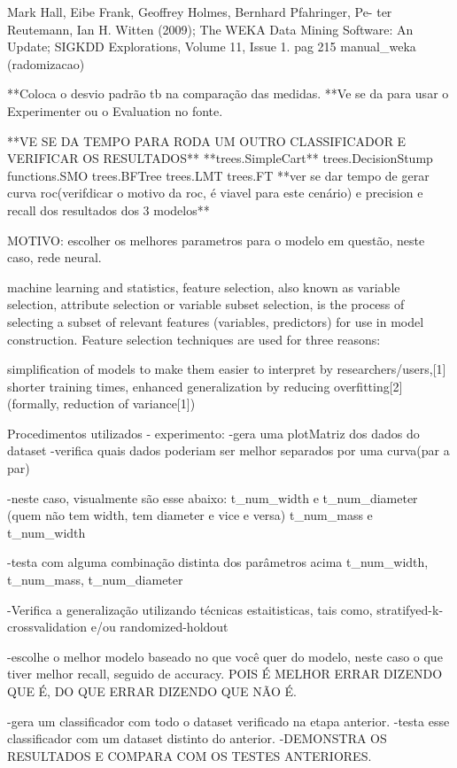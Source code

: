 Mark Hall, Eibe Frank, Geoffrey Holmes, Bernhard Pfahringer, Pe- ter Reutemann, Ian H. Witten (2009); The WEKA Data Mining Software: An Update; SIGKDD Explorations, Volume 11, Issue 1.
pag 215 manual_weka (radomizacao)

**Coloca o desvio padrão tb na comparação das medidas.
**Ve se da para usar o Experimenter ou o Evaluation no fonte.


**VE SE DA TEMPO PARA RODA UM OUTRO CLASSIFICADOR E VERIFICAR OS RESULTADOS**
**trees.SimpleCart**
trees.DecisionStump
functions.SMO
trees.BFTree
trees.LMT
trees.FT
**ver se dar tempo de gerar curva roc(verifdicar o motivo da roc, é viavel para este cenário) e precision e recall dos resultados dos 3 modelos**

MOTIVO:
escolher os melhores parametros para o modelo em questão, neste caso, rede neural.

 machine learning and statistics, feature selection, also known as variable selection, attribute selection or variable subset selection, is the process of selecting a subset of relevant features (variables, predictors) for use in model construction. Feature selection techniques are used for three reasons:

        simplification of models to make them easier to interpret by researchers/users,[1]
        shorter training times,
        enhanced generalization by reducing overfitting[2](formally, reduction of variance[1])



Procedimentos utilizados - experimento:
-gera uma plotMatriz dos dados do dataset
-verifica quais dados poderiam ser melhor separados por uma curva(par a par)

-neste caso, visualmente são esse abaixo:
t_num_width e t_num_diameter
(quem não tem width, tem diameter e vice e versa)
t_num_mass e t_num_width

-testa com alguma combinação distinta dos parâmetros acima
t_num_width, t_num_mass, t_num_diameter 

-Verifica a generalização utilizando técnicas estaitisticas, tais como, stratifyed-k-crossvalidation e/ou randomized-holdout

-escolhe o melhor modelo baseado no que você quer do modelo, neste caso o que tiver melhor recall, seguido de accuracy. POIS É MELHOR ERRAR DIZENDO QUE É, DO QUE ERRAR DIZENDO QUE NÃO É.

-gera um classificador com todo o dataset verificado na etapa anterior.
-testa esse classificador com um dataset distinto do anterior.
-DEMONSTRA OS RESULTADOS E COMPARA COM OS TESTES ANTERIORES.